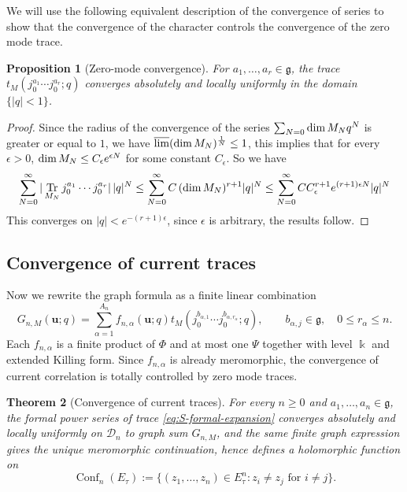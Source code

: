 \documentclass[11pt,a4paper]{amsart}
\numberwithin{equation}{section}
\newtheorem{theorem}{Theorem}[section]
\newtheorem{proposition}[theorem]{Proposition}
\theoremstyle{definition}
\theoremstyle{remark}
\DeclareMathOperator{\Tr}{Tr}
\newcommand{\g}{\mathfrak g}
\newcommand{\kk}{\Bbbk}
\newcommand{\scrD}{\mathscr D}
\newcommand{\ubf}{\boldsymbol u}
\begin{document}
We will use the following equivalent description of the convergence of series to show that the convergence of the character controls the convergence of the zero mode trace.
\begin{proposition}[Zero-mode convergence]
	\label{prop:zero-mode-convergence}
	For $ a_1 , \dots , a_r \in \g $, the trace 
	$t_M(j_0^{a_1}\cdots j_0^{a_r};q)$  
	converges absolutely and locally uniformly in the domain $\{|q|<1\}$.
\end{proposition}
\begin{proof}
	Since the radius of the convergence of the series $ \sum_{ N= 0 } {\rm dim} \, M_N q^N $ is greater or equal to $1$, we have
	$ \overline {\lim} ({\rm dim} \, M_N )^{\frac 1 N} \leq  1$, this implies that for every $\epsilon > 0 $,
	$ {\rm dim} \, M_N \leq C_\epsilon e^{\epsilon N } $ for some constant $C_\epsilon $. So we have
	\[ \sum_{ N=0}^\infty | \Tr_{M_N}  j^{a_1}_0  \cdots j^{a_r}_0 | \, |q|^N \leq \sum_{ N =0 }^\infty 
	C \, ({\rm dim}\, M_N )^{r+1}   |q|^N \leq \sum_{N=0}^\infty  CC_\epsilon^{r+1} e^{( r+1 ) \epsilon N} |q|^N \]
	This converges on $ | q | < e^{ - ( r+1 ) \epsilon} $, since $\epsilon$ is arbitrary, the results follow. 
\end{proof}


\subsection{Convergence of current traces}
Now we rewrite the graph formula as a finite linear combination
\begin{equation}
 G_{n,M}(\ubf;q)
 =\sum_{\alpha=1}^{A_n}
 f_{n,\alpha}(\ubf;q)t_M(j_0^{b_{\alpha,1}}\cdots j_0^{b_{\alpha,r_\alpha}};q),
 \qquad b_{\alpha,j}\in\g,\quad 0\leq r_\alpha\leq n.
 \label{eq:finite-zero-mode-reduction}
\end{equation}
Each $f_{n,\alpha}$ is a finite product of $\Phi$ and at most one $\Psi$ together with level $\kk$ and extended Killing form. Since $f_{n,\alpha}$ is already meromorphic, the convergence of current correlation is totally controlled by zero mode traces.

\begin{theorem}[Convergence of current traces]
\label{thm:current-convergence}
For every $n\geq0$ and $a_1,\ldots,a_n\in\g$, the formal power series of trace \eqref{eq:S-formal-expansion} converges absolutely and locally uniformly on $\scrD_n$ to graph sum $G_{n,M}$, and the same finite graph expression gives the unique meromorphic continuation, hence defines a holomorphic function on
\begin{equation*}
 \operatorname{Conf}_n(E_\tau)
 :=\{(z_1,\ldots,z_n)\in E_\tau^n:z_i\neq z_j\text{ for }i\neq j\}.
\end{equation*}

\end{theorem}
\end{document}
